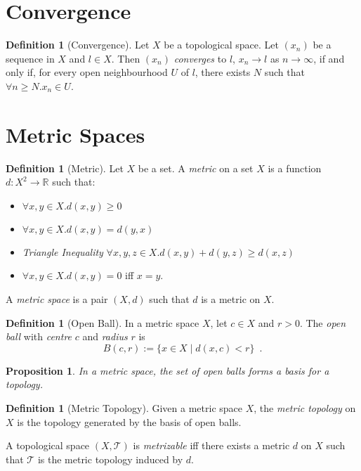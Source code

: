 \documentclass{book}
\newtheorem{prop}[ax]{Proposition}
\theoremstyle{definition}
\newtheorem{df}[ax]{Definition}
\begin{document}
\section{Convergence}

\begin{df}[Convergence]
Let $X$ be a topological space. Let $(x_n)$ be a sequence in $X$ and $l \in X$. Then $(x_n)$ \emph{converges} to $l$, $x_n \rightarrow l$ as $n \rightarrow \infty$, if and only if, for every open neighbourhood $U$ of $l$, there exists $N$ such that $\forall n \geq N. x_n \in U$.
\end{df}

\section{Metric Spaces}

\begin{df}[Metric]
Let $X$ be a set. A \emph{metric} on a set $X$ is a function $d : X^2 \rightarrow \mathbb{R}$ such that:
\begin{itemize}
\item $\forall x,y \in X. d(x,y) \geq 0$
\item $\forall x,y \in X. d(x,y) = d(y,x)$
\item \emph{Triangle Inequality} $\forall x,y,z \in X. d(x,y) + d(y,z) \geq d(x,z)$
\item $\forall x,y \in X. d(x,y) = 0$ iff $x = y$.
\end{itemize}
A \emph{metric space} is a pair $(X,d)$ such that $d$ is a metric on $X$.
\end{df}

\begin{df}[Open Ball]
In a metric space $X$, let $c \in X$ and $r > 0$. The \emph{open ball} with \emph{centre} $c$ and \emph{radius} $r$ is
\[ B(c,r) := \{ x \in X \mid d(x,c) < r \} \enspace . \]
\end{df}

\begin{prop}
In a metric space, the set of open balls forms a basis for a topology.
\end{prop}

\begin{df}[Metric Topology]
Given a metric space $X$, the \emph{metric topology} on $X$ is the topology generated by the basis of open balls.

A topological space $(X, \mathcal{T})$ is \emph{metrizable} iff there exists a metric $d$ on $X$ such that $\mathcal{T}$ is the metric topology induced by $d$.
\end{df}
\end{document}
